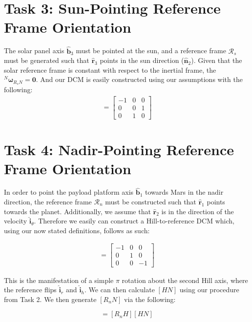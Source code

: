 \documentclass[paper]{aiaaNew}
\begin{document}
\section*{Task 3: Sun-Pointing Reference Frame Orientation}
The solar panel axis $\hat{\bm{b}}_3$ must be pointed at the sun, and a reference frame $\mathcal{R}_s$ must be generated such that $\hat{\bm{r}}_3$ points in the sun direction ($\hat{\bm{n}}_2$). Given that the solar reference frame is constant with respect to the inertial frame, the $^N\bm{\omega}_{R_s N} = \bm{0}$. And our DCM is easily constructed using our assumptions with the following: 
\begin{align}
  [R_sN] =  
  \begin{bmatrix}
  -1 & 0 & 0 \\
  0 & 0 & 1 \\
  0 & 1 & 0
  \end{bmatrix}
\end{align}








\section*{Task 4: Nadir-Pointing Reference Frame Orientation}
In order to point the payload platform axis $\hat{\bm{b}}_1$ towards Mars in the nadir direction, the reference frame $\mathcal{R}_n$ must be constructed such that $\hat{\bm{r}}_1$ points towards the planet. Additionally, we assume that $\hat{\bm{r}}_2$ is in the direction of the velocity $\hat{\bm{i}}_\theta$. Therefore we easily can construct a Hill-to-reference DCM which, using our now stated definitions, follows as such: 

\begin{align}
  [R_nH] =  
  \begin{bmatrix}
  -1 & 0 & 0 \\
  0 & 1 & 0 \\
  0 & 0 & -1
  \end{bmatrix}
\end{align}

This is the manifestation of a simple $\pi$ rotation about the second Hill axis, where the reference flips $\hat{\bm{i}}_r$ and $\hat{\bm{i}}_h$. We can then calculate $[HN]$ using our procedure from Task 2. We then generate $[R_nN]$ via the following:

\begin{equation}
  [R_nN] = [R_nH][HN]
\end{equation}
\end{document}

